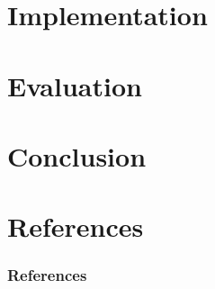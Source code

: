 \documentclass{beamer}
\begin{document}
\section{Implementation}
\section{Evaluation}
\section{Conclusion}

\appendix %

\section{References}
\begin{frame}[allowframebreaks]
  \frametitle{References}
  
  
\end{frame}
\end{document}

